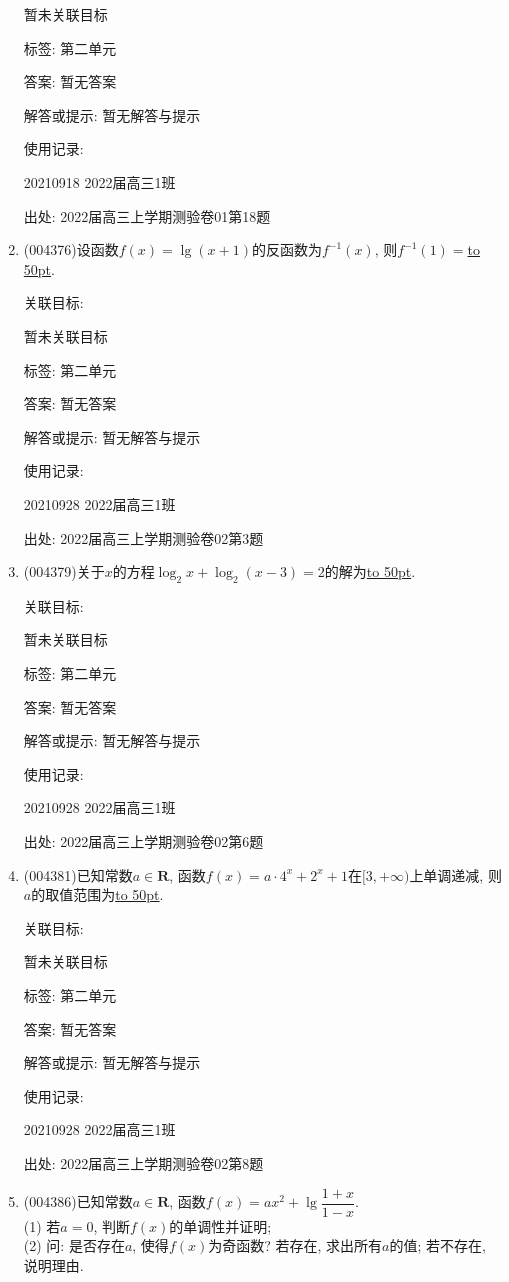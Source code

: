 \documentclass[10pt,a4paper]{article}
\newcommand{\blank}[1]{\underline{\hbox to #1pt{}}}
\begin{document}
\begin{enumerate}[1.]
暂未关联目标



标签: 第二单元

答案: 暂无答案

解答或提示: 暂无解答与提示

使用记录:

20210918	2022届高三1班		


出处: 2022届高三上学期测验卷01第18题
\item { (004376)}设函数$f(x)=\lg (x+1)$的反函数为$f^{-1}(x)$, 则$f^{-1}(1)=$\blank{50}.


关联目标:

暂未关联目标



标签: 第二单元

答案: 暂无答案

解答或提示: 暂无解答与提示

使用记录:

20210928	2022届高三1班	


出处: 2022届高三上学期测验卷02第3题
\item { (004379)}关于$x$的方程$\log_2 x+\log_2(x-3)=2$的解为\blank{50}.


关联目标:

暂未关联目标



标签: 第二单元

答案: 暂无答案

解答或提示: 暂无解答与提示

使用记录:

20210928	2022届高三1班	


出处: 2022届高三上学期测验卷02第6题
\item { (004381)}已知常数$a\in \mathbf{R}$, 函数$f(x)=a\cdot 4^x+2^x+1$在$[3,+\infty)$上单调递减, 则$a$的取值范围为\blank{50}.


关联目标:

暂未关联目标



标签: 第二单元

答案: 暂无答案

解答或提示: 暂无解答与提示

使用记录:

20210928	2022届高三1班	


出处: 2022届高三上学期测验卷02第8题
\item { (004386)}已知常数$a\in \mathbf{R}$, 函数$f(x)=ax^2+\lg \dfrac{1+x}{1-x}$.\\
(1) 若$a=0$, 判断$f(x)$的单调性并证明;\\
(2) 问: 是否存在$a$, 使得$f(x)$为奇函数? 若存在, 求出所有$a$的值; 若不存在, 说明理由.



\end{enumerate}
\end{document}
